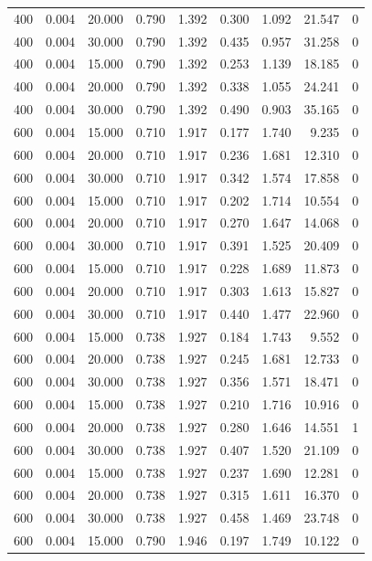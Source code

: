 \begin{tabular}{rrrrrrrrr}
400 & 0.004 & 20.000 & 0.790 & 1.392 & 0.300 & 1.092 & 21.547 & 0 \\
400 & 0.004 & 30.000 & 0.790 & 1.392 & 0.435 & 0.957 & 31.258 & 0 \\
400 & 0.004 & 15.000 & 0.790 & 1.392 & 0.253 & 1.139 & 18.185 & 0 \\
400 & 0.004 & 20.000 & 0.790 & 1.392 & 0.338 & 1.055 & 24.241 & 0 \\
400 & 0.004 & 30.000 & 0.790 & 1.392 & 0.490 & 0.903 & 35.165 & 0 \\
600 & 0.004 & 15.000 & 0.710 & 1.917 & 0.177 & 1.740 & 9.235 & 0 \\
600 & 0.004 & 20.000 & 0.710 & 1.917 & 0.236 & 1.681 & 12.310 & 0 \\
600 & 0.004 & 30.000 & 0.710 & 1.917 & 0.342 & 1.574 & 17.858 & 0 \\
600 & 0.004 & 15.000 & 0.710 & 1.917 & 0.202 & 1.714 & 10.554 & 0 \\
600 & 0.004 & 20.000 & 0.710 & 1.917 & 0.270 & 1.647 & 14.068 & 0 \\
600 & 0.004 & 30.000 & 0.710 & 1.917 & 0.391 & 1.525 & 20.409 & 0 \\
600 & 0.004 & 15.000 & 0.710 & 1.917 & 0.228 & 1.689 & 11.873 & 0 \\
600 & 0.004 & 20.000 & 0.710 & 1.917 & 0.303 & 1.613 & 15.827 & 0 \\
600 & 0.004 & 30.000 & 0.710 & 1.917 & 0.440 & 1.477 & 22.960 & 0 \\
600 & 0.004 & 15.000 & 0.738 & 1.927 & 0.184 & 1.743 & 9.552 & 0 \\
600 & 0.004 & 20.000 & 0.738 & 1.927 & 0.245 & 1.681 & 12.733 & 0 \\
600 & 0.004 & 30.000 & 0.738 & 1.927 & 0.356 & 1.571 & 18.471 & 0 \\
600 & 0.004 & 15.000 & 0.738 & 1.927 & 0.210 & 1.716 & 10.916 & 0 \\
600 & 0.004 & 20.000 & 0.738 & 1.927 & 0.280 & 1.646 & 14.551 & 1 \\
600 & 0.004 & 30.000 & 0.738 & 1.927 & 0.407 & 1.520 & 21.109 & 0 \\
600 & 0.004 & 15.000 & 0.738 & 1.927 & 0.237 & 1.690 & 12.281 & 0 \\
600 & 0.004 & 20.000 & 0.738 & 1.927 & 0.315 & 1.611 & 16.370 & 0 \\
600 & 0.004 & 30.000 & 0.738 & 1.927 & 0.458 & 1.469 & 23.748 & 0 \\
600 & 0.004 & 15.000 & 0.790 & 1.946 & 0.197 & 1.749 & 10.122 & 0 \\

\end{tabular}
